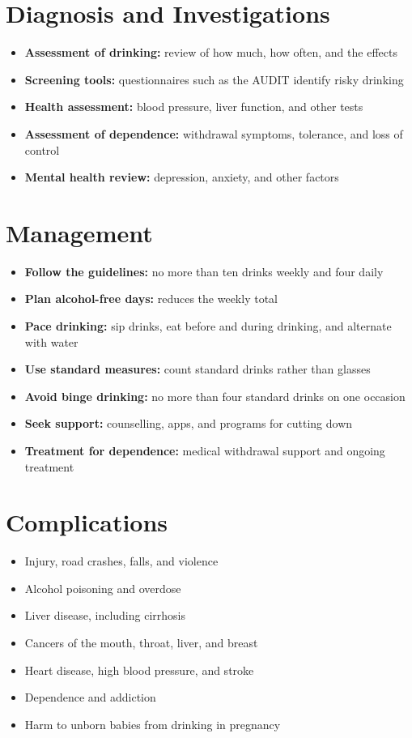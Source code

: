 \section*{Diagnosis and Investigations}
\begin{itemize}
    \item \textbf{Assessment of drinking:} review of how much, how often, and the effects
    \item \textbf{Screening tools:} questionnaires such as the AUDIT identify risky drinking
    \item \textbf{Health assessment:} blood pressure, liver function, and other tests
    \item \textbf{Assessment of dependence:} withdrawal symptoms, tolerance, and loss of control
    \item \textbf{Mental health review:} depression, anxiety, and other factors
\end{itemize}

\section*{Management}
\begin{itemize}
    \item \textbf{Follow the guidelines:} no more than ten drinks weekly and four daily
    \item \textbf{Plan alcohol-free days:} reduces the weekly total
    \item \textbf{Pace drinking:} sip drinks, eat before and during drinking, and alternate with water
    \item \textbf{Use standard measures:} count standard drinks rather than glasses
    \item \textbf{Avoid binge drinking:} no more than four standard drinks on one occasion
    \item \textbf{Seek support:} counselling, apps, and programs for cutting down
    \item \textbf{Treatment for dependence:} medical withdrawal support and ongoing treatment
\end{itemize}

\section*{Complications}
\begin{itemize}
    \item Injury, road crashes, falls, and violence
    \item Alcohol poisoning and overdose
    \item Liver disease, including cirrhosis
    \item Cancers of the mouth, throat, liver, and breast
    \item Heart disease, high blood pressure, and stroke
    \item Dependence and addiction
    \item Harm to unborn babies from drinking in pregnancy
\end{itemize}

